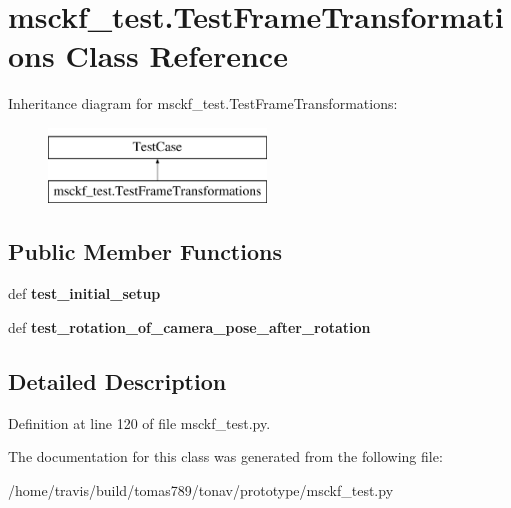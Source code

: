 \hypertarget{classmsckf__test_1_1_test_frame_transformations}{\section{msckf\-\_\-test.\-Test\-Frame\-Transformations Class Reference}
\label{classmsckf__test_1_1_test_frame_transformations}
}
Inheritance diagram for msckf\-\_\-test.\-Test\-Frame\-Transformations\-:\begin{figure}[H]
\begin{center}
\leavevmode
\includegraphics[height=2.000000cm]{classmsckf__test_1_1_test_frame_transformations}
\end{center}
\end{figure}
\subsection*{Public Member Functions}
\begin{DoxyCompactItemize}
\item 
\hypertarget{classmsckf__test_1_1_test_frame_transformations_a723d6acda4eab14e0388203fc4e9f206}{def {\bfseries test\-\_\-initial\-\_\-setup}}\label{classmsckf__test_1_1_test_frame_transformations_a723d6acda4eab14e0388203fc4e9f206}

\item 
\hypertarget{classmsckf__test_1_1_test_frame_transformations_a7ab5c8610b77c7aa5954705ff579aebe}{def {\bfseries test\-\_\-rotation\-\_\-of\-\_\-camera\-\_\-pose\-\_\-after\-\_\-rotation}}\label{classmsckf__test_1_1_test_frame_transformations_a7ab5c8610b77c7aa5954705ff579aebe}

\end{DoxyCompactItemize}


\subsection{Detailed Description}


Definition at line 120 of file msckf\-\_\-test.\-py.



The documentation for this class was generated from the following file\-:\begin{DoxyCompactItemize}
\item 
/home/travis/build/tomas789/tonav/prototype/msckf\-\_\-test.\-py\end{DoxyCompactItemize}
